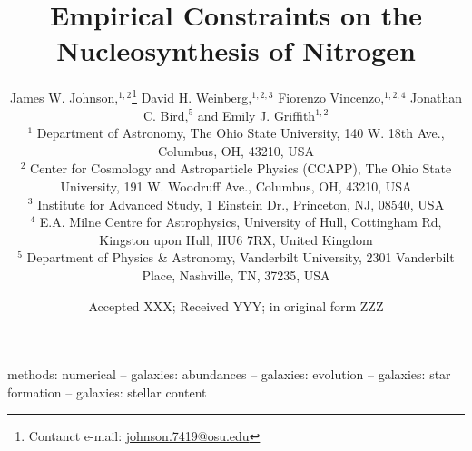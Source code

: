 \documentclass[fleqn, usenatbib]{mnras}
\title[Empirical Constraints on the Nucleosynthesis of Nitrogen]{Empirical
Constraints on the Nucleosynthesis of Nitrogen}
\author[J.W. Johnson et al.]{James W. Johnson,$^{1, 2}$\thanks{
	Contanct e-mail: \href{mailto:
	johnson.7419@osu.edu}{johnson.7419@osu.edu}}
	David H. Weinberg,$^{1, 2, 3}$
	Fiorenzo Vincenzo,$^{1, 2, 4}$
	Jonathan C. Bird,$^{5}$ and
	\newauthor
	Emily J. Griffith$^{1, 2}$
	\\
	$^{1}$ Department of Astronomy, The Ohio State University,
	140 W. 18th Ave., Columbus, OH, 43210, USA
	\\
	$^{2}$ Center for Cosmology and Astroparticle Physics (CCAPP),
	The Ohio State University, 191 W. Woodruff Ave., Columbus, OH, 43210, USA
	\\
	$^{3}$ Institute for Advanced Study, 1 Einstein Dr., Princeton, NJ, 08540,
	USA
	\\
	$^{4}$ E.A. Milne Centre for Astrophysics, University of Hull, Cottingham
	Rd, Kingston upon Hull, HU6 7RX, United Kingdom
	\\
	$^{5}$ Department of Physics \& Astronomy, Vanderbilt University,
	2301 Vanderbilt Place, Nashville, TN, 37235, USA
}
\date{Accepted XXX; Received YYY; in original form ZZZ}
\begin{document}
\label{firstpage}
\pagerange{\pageref{firstpage}--\pageref{lastpage}}
\maketitle



\begin{keywords}
methods: numerical -- galaxies: abundances -- galaxies: evolution -- galaxies:
star formation -- galaxies: stellar content
\end{keywords}












\begin{appendices}

\end{appendices}

\label{lastpage}
\end{document}
